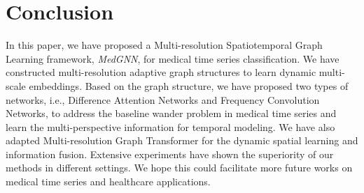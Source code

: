 \vspace{-1.5mm}
\section{Conclusion}
In this paper, we have proposed a Multi-resolution Spatiotemporal Graph Learning framework, \textit{{MedGNN}}, 
for medical time series classification. We have constructed multi-resolution adaptive graph structures to learn dynamic multi-scale embeddings. Based on the graph structure, we have proposed two types of networks, i.e., Difference Attention Networks and Frequency Convolution Networks, to address the baseline wander problem in medical time series and learn the multi-perspective information for temporal modeling. We have also adapted Multi-resolution Graph Transformer for the dynamic spatial learning and information fusion. Extensive experiments have shown the superiority of our methods in different settings. We hope this could facilitate more future works on medical time series and healthcare applications.